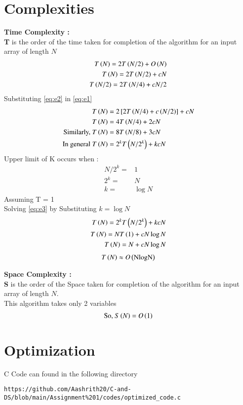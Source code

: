 \documentclass[journal,12pt,twocolumn]{IEEEtran}
\begin{document}
\section{Complexities}
\textbf{Time Complexity : }\\
\textbf{T} is the order of the time taken for completion of the algorithm for an input array of length $N$
\begin{align}
    T\brak{N} = 2T\brak{N/2} + O\brak{N} \\
    \label{eq:e1}
    T\brak{N} = 2T\brak{N/2} + cN \\
    \label{eq:e2}
    T\brak{N/2} = 2T\brak{N/4} + cN/2
\end{align}
Substituting \eqref{eq:e2} in \eqref{eq:e1}
\begin{align}
    T\brak{N} &= 2\sbrak{2T\brak{N/4}+c\brak{N/2}} + cN \\
    T\brak{N} &= 4T\brak{N/4} + 2cN \\
    \text{Similarly, }T\brak{N} &= 8T\brak{N/8} + 3cN \\
    \text{In general }T\brak{N}&=2^k T\brak{N/2^k} + kcN 
    \label{eq:e3}
\end{align}
Upper limit of K occurs when :
\begin{align}
    N/2^k =& 1\\
    2^k =& N \\
    k =& \log{N}
\end{align}
Assuming T = 1 \\
Solving \eqref{eq:e3} by Substituting $k =\log{N}$ \\
\begin{align}
    T\left(N\right)=2^k T\left(N/2^k\right) + kcN\\
    T\left(N\right)=N T\left(1\right) + cN\log{N} \\
    T\left(N\right)=N+cN\log{N}
\end{align}
\begin{align}
    T\left(N\right) \approx O\left(\text{NlogN}\right)
\end{align}

\textbf{Space Complexity : }\\
\textbf{S} is the order of the Space taken for completion of the algorithm for an input array of length $N$.\\
This algorithm takes only 2 variables 
\begin{align}
    \text{So, }S\left(N\right) = O\left(1\right)
\end{align}
\section{Optimization}
C Code can found in the following directory
\begin{lstlisting}
https://github.com/Aashrith20/C-and-DS/blob/main/Assignment%201/codes/optimized_code.c
\end{lstlisting}
\end{document}
